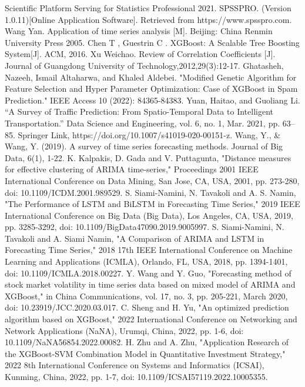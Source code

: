\documentclass[12pt]{article}  %
\begin{document}
    
    \begin{thebibliography}{99}
     Scientific Platform Serving for Statistics Professional 2021. SPSSPRO. (Version 1.0.11)[Online Application Software]. Retrieved from https://www.spsspro.com.
     Wang Yan. Application of time series analysis [M]. Beijing: China Renmin University Press 2005.
     Chen T , Guestrin C . XGBoost: A Scalable Tree Boosting System[J]. ACM, 2016.
     Xu Weichao. Review of Correlation Coefficients [J]. Journal of Guangdong University of Technology,2012,29(3):12-17.
     Ghatasheh, Nazeeh, Ismail Altaharwa, and Khaled Aldebei. "Modified Genetic Algorithm for Feature Selection and Hyper Parameter Optimization: Case of XGBoost in Spam Prediction." IEEE Access 10 (2022): 84365-84383.
     Yuan, Haitao, and Guoliang Li. “A Survey of Traffic Prediction: From Spatio-Temporal Data to Intelligent Transportation.” Data Science and Engineering, vol. 6, no. 1, Mar. 2021, pp. 63–85. Springer Link, https://doi.org/10.1007/s41019-020-00151-z.
     Wang, Y., \& Wang, Y. (2019). A survey of time series forecasting methods. Journal of Big Data, 6(1), 1-22.
     K. Kalpakis, D. Gada and V. Puttagunta, "Distance measures for effective clustering of ARIMA time-series," Proceedings 2001 IEEE International Conference on Data Mining, San Jose, CA, USA, 2001, pp. 273-280, doi: 10.1109/ICDM.2001.989529.
     S. Siami-Namini, N. Tavakoli and A. S. Namin, "The Performance of LSTM and BiLSTM in Forecasting Time Series," 2019 IEEE International Conference on Big Data (Big Data), Los Angeles, CA, USA, 2019, pp. 3285-3292, doi: 10.1109/BigData47090.2019.9005997.
     S. Siami-Namini, N. Tavakoli and A. Siami Namin, "A Comparison of ARIMA and LSTM in Forecasting Time Series," 2018 17th IEEE International Conference on Machine Learning and Applications (ICMLA), Orlando, FL, USA, 2018, pp. 1394-1401, doi: 10.1109/ICMLA.2018.00227.
     Y. Wang and Y. Guo, "Forecasting method of stock market volatility in time series data based on mixed model of ARIMA and XGBoost," in China Communications, vol. 17, no. 3, pp. 205-221, March 2020, doi: 10.23919/JCC.2020.03.017.
     C. Sheng and H. Yu, "An optimized prediction algorithm based on XGBoost," 2022 International Conference on Networking and Network Applications (NaNA), Urumqi, China, 2022, pp. 1-6, doi: 10.1109/NaNA56854.2022.00082.
     H. Zhu and A. Zhu, "Application Research of the XGBoost-SVM Combination Model in Quantitative Investment Strategy," 2022 8th International Conference on Systems and Informatics (ICSAI), Kunming, China, 2022, pp. 1-7, doi: 10.1109/ICSAI57119.2022.10005355.
    \end{thebibliography}

    
\end{document}
